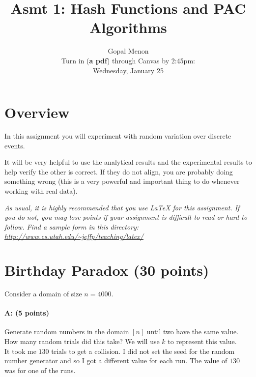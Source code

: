 \documentclass[11pt]{article}
\title{Asmt 1: Hash Functions and PAC Algorithms}
\author{Gopal Menon\\Turn in (\textbf{a pdf}) through Canvas by 2:45pm: \\
Wednesday, January 25}
\date{}
\begin{document}
\maketitle






\section*{Overview}

In this assignment you will experiment with random variation over discrete events.  


It will be very helpful to use the analytical results and the experimental results to help verify the other is correct.  If they do not align, you are probably doing something wrong (this is a very powerful and important thing to do whenever working with real data).  


\vspace{.1in}

\emph{As usual, it is highly recommended that you use LaTeX for this assignment.  If you do not, you may lose points if your assignment is difficult to read or hard to follow.  Find a sample form in this directory:
\url{http://www.cs.utah.edu/~jeffp/teaching/latex/}}

\section{Birthday Paradox (30 points)}

Consider a domain of size $n = 4000$.  

\paragraph{A: (5 points)}
Generate random numbers in the domain $[n]$ until two have the same value.  How many random trials did this take?  
We will use $k$ to represent this value. \\

It took me $130$ trials to get a collision. I did not set the seed for the random number generator and so I got a different value for each run. The value of $130$ was for one of the runs.
\end{document}
